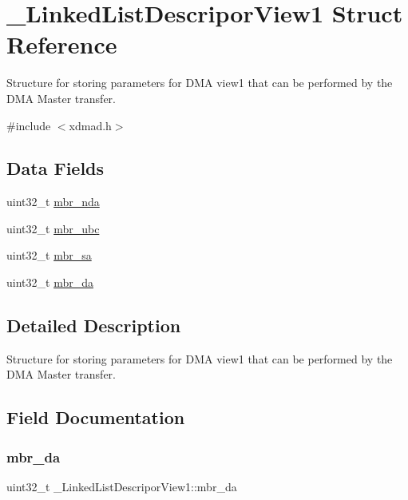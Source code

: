 \hypertarget{struct__LinkedListDescriporView1}{}\section{\+\_\+\+Linked\+List\+Descripor\+View1 Struct Reference}
\label{struct__LinkedListDescriporView1}


Structure for storing parameters for D\+MA view1 that can be performed by the D\+MA Master transfer.  




{\ttfamily \#include $<$xdmad.\+h$>$}

\subsection*{Data Fields}
\begin{DoxyCompactItemize}
\item 
uint32\+\_\+t \mbox{\hyperlink{struct__LinkedListDescriporView1_a6b3df276ecc149cd8584551a05d0c84c}{mbr\+\_\+nda}}
\item 
uint32\+\_\+t \mbox{\hyperlink{struct__LinkedListDescriporView1_af018fba1d23fef8a49de0422db871dae}{mbr\+\_\+ubc}}
\item 
uint32\+\_\+t \mbox{\hyperlink{struct__LinkedListDescriporView1_ac8df8439663ea19820f9a8ae4e69b2bb}{mbr\+\_\+sa}}
\item 
uint32\+\_\+t \mbox{\hyperlink{struct__LinkedListDescriporView1_a5778ab744005d87cf89ca054b3952070}{mbr\+\_\+da}}
\end{DoxyCompactItemize}


\subsection{Detailed Description}
Structure for storing parameters for D\+MA view1 that can be performed by the D\+MA Master transfer. 

\subsection{Field Documentation}
\mbox{\label{struct__LinkedListDescriporView1_a5778ab744005d87cf89ca054b3952070}} 
\subsubsection{\texorpdfstring{mbr\_da}{mbr\_da}}
{\footnotesize\ttfamily uint32\+\_\+t \+\_\+\+Linked\+List\+Descripor\+View1\+::mbr\+\_\+da}

